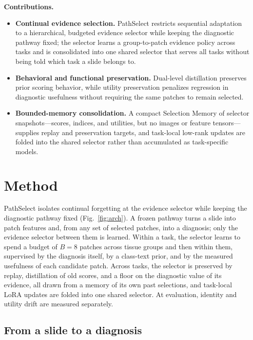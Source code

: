 \documentclass{article}
\begin{document}
\textbf{Contributions.}
\begin{itemize}
    \item \textbf{Continual evidence selection.} PathSelect restricts sequential adaptation to a hierarchical, budgeted evidence selector while keeping the diagnostic pathway fixed; the selector learns a group-to-patch evidence policy across tasks and is consolidated into one shared selector that serves all tasks without being told which task a slide belongs to.
    \item \textbf{Behavioral and functional preservation.} Dual-level distillation preserves prior scoring behavior, while utility preservation penalizes regression in diagnostic usefulness without requiring the same patches to remain selected.
    \item \textbf{Bounded-memory consolidation.} A compact Selection Memory of selector snapshots---scores, indices, and utilities, but no images or feature tensors---supplies replay and preservation targets, and task-local low-rank updates are folded into the shared selector rather than accumulated as task-specific models.
\end{itemize}


\section{Method}
\label{sec:method}

PathSelect isolates continual forgetting at the evidence selector while keeping the diagnostic pathway fixed (Fig.~\ref{fig:arch}). A frozen pathway turns a slide into patch features and, from any set of selected patches, into a diagnosis; only the evidence selector between them is learned. Within a task, the selector learns to spend a budget of $B=8$ patches across tissue groups and then within them, supervised by the diagnosis itself, by a class-text prior, and by the measured usefulness of each candidate patch. Across tasks, the selector is preserved by replay, distillation of old scores, and a floor on the diagnostic value of its evidence, all drawn from a memory of its own past selections, and task-local LoRA updates are folded into one shared selector. At evaluation, identity and utility drift are measured separately.

\subsection{From a slide to a diagnosis}
\label{ssec:setup}
\end{document}
